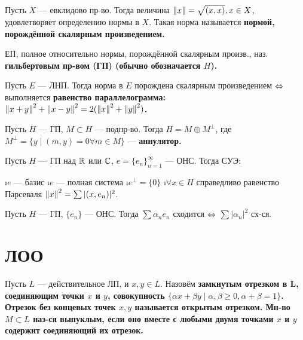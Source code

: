 \begin{stmt}
Пусть $X$ --- евклидово пр-во. Тогда величина $\left\lVert x\right\rVert = \sqrt{(x, x)}, x \in X$, удовлетворяет определению нормы в $X$. Такая норма называется \bf{нормой, порождённой скалярным произведением}. 
\end{stmt}

\begin{defn}
ЕП, полное относительно нормы, порождённой скалярным произв., наз. \bf{гильбертовым пр-вом (ГП)} (обычно обозначается $H$).
\end{defn}

\begin{thm}[4.2]
Пусть $E$ --- ЛНП. Тогда норма в $E$ порождена скалярным произведением $\Leftrightarrow$ выполняется \bf{равенство параллелограмма}: $\left\lVert x+y\right\rVert^2+\left\lVert x-y\right\rVert^2 = 2(\left\lVert x\right\rVert^2+\left\lVert y\right\rVert^2)$.
\end{thm}

\begin{thm}
Пусть $H$ --- ГП, $M \subset H$ --- подпр-во. Тогда $H = M \oplus M^\perp$, где $M^\perp = \{y \mid (m, y) = 0 \forall m \in M\}$ --- \bf{аннулятор}.
\end{thm}

\begin{thm}[4.4]
Пусть $H$ --- ГП над $\mathbb{R}$ или $\mathbb{C}$, $e = \{e_n\}_{n=1}^\infty$ --- ОНС. Тогда СУЭ:
\begin{enumerate}
\i $e$ --- базис
\i $e$ --- полная система
\i $e^\perp = \{0\}$
\i $\forall x \in H$ справедливо равенство Парсеваля $\left\lVert x\right\rVert^2 = \sum |(x, e_n)|^2$.
\end{enumerate}
\end{thm}

\begin{thm}
Пусть $H$ --- ГП, $\{e_n\}$ --- ОНС. Тогда $\sum \alpha_n e_n$ сходится $\Leftrightarrow$ $\sum |\alpha_n|^2$ сх-ся.
\end{thm}

\section{ЛОО}

\begin{defn}
Пусть $L$ --- действительное ЛП, и $x, y \in L$. Назовём \bf{замкнутым отрезком} в L, соединяющим точки $x$ и $y$, совокупность $\{\alpha x + \beta y \mid \alpha, \beta \ge 0, \alpha + \beta = 1\}$. Отрезок без концевых точек $x, y$ называется \bf{открытым отрезком}.
Мн-во $M \subset L$ наз-ся выпуклым, если оно вместе с любыми двумя точками $x$ и $y$ содержит соединяющий их отрезок.
\end{defn}

